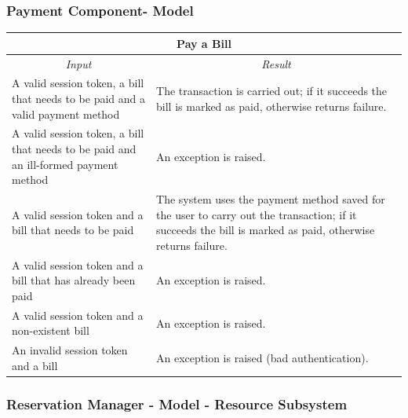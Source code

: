 \documentclass[english]{article}
\begin{document}
\subsubsection{Payment Component- Model}

\begin{center}
	\begin{tabular}{ | p{6cm} | p{6cm} | }
		\hline 
		\multicolumn{2}{|c|}{\textbf{Pay a Bill}} \\
		\hline
		\multicolumn{1}{|c|}{\textit{Input}} & \multicolumn{1}{c|}{\textit{Result}} \\
		\hline
		A valid session token, a bill that needs to be paid and a valid payment method &  The transaction is carried out; if it succeeds the bill is marked as paid, otherwise returns failure. \\
		\hline
		A valid session token, a bill that needs to be paid and an ill-formed payment method & An exception is raised. \\
		\hline
		A valid session token and a bill that needs to be paid & The system uses the payment method saved for the user to carry out the transaction; if it succeeds the bill is marked as paid, otherwise returns failure. \\
		\hline
		A valid session token and a bill that has already been paid & An exception is raised. \\
		\hline
		A valid session token and a non-existent bill & An exception is raised. \\
		\hline
		An invalid session token and a bill & An exception is raised (bad authentication). \\
		\hline
	\end{tabular}
\end{center}

\subsubsection{Reservation Manager - Model - Resource Subsystem}
\end{document}
